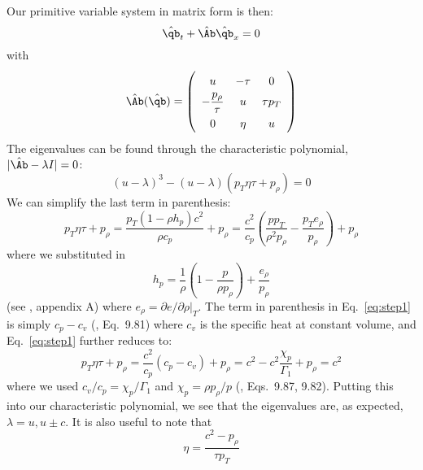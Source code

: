 Our primitive variable system in matrix form is then:
\begin{equation}
\hat{\qb}_t + \hat{\Ab} \hat{\qb}_x = 0
\end{equation}
with
\begin{equation}
\renewcommand{\arraystretch}{1.5}
\hat{\Ab}(\hat{\qb}) =
\left (
\begin{array}{ccc}
u                   & -\tau & 0 \\
-\dfrac{p_\rho}{\tau} & u    & \tau p_T \\
0                   & \eta & u
\end{array}
\right )
\end{equation}
The eigenvalues can be found through the characteristic polynomial,
$|\hat{\Ab} - \lambda I| = 0$:
\begin{equation}
(u - \lambda)^3 - (u -\lambda) \left ( {p_T \eta\tau} + p_\rho \right ) = 0
\end{equation}
We can simplify the last term in parenthesis:
\begin{equation}
{p_T \eta\tau} + p_\rho = \frac{p_T (1 - \rho h_p) c^2}{\rho c_p} + p_\rho
                               = \frac{c^2}{c_p}\left ( \frac{p p_T}{\rho^2 p_\rho} - \frac{p_T e_\rho}{p_\rho} \right ) + p_\rho \label{eq:step1}
\end{equation}
where we substituted in
\begin{equation}
h_p = \frac{1}{\rho} \left ( 1 - \frac{p}{\rho p_\rho} \right ) + \frac{e_\rho}{p_\rho}
\end{equation}
(see \cite{ABRZ:I}, appendix A) where $e_\rho = \partial e/\partial
\rho |_T$.  The term in parenthesis in Eq.~\ref{eq:step1} is simply
$c_p - c_v$ (\cite{cg}, Eq.~9.81) where $c_v$ is the specific heat
at constant volume, and Eq.~\ref{eq:step1} further reduces to:
\begin{equation}
{p_T \eta\tau} + p_\rho = \frac{c^2}{c_p} (c_p - c_v) + p_\rho
                               = c^2 - c^2 \frac{\chi_p}{\Gamma_1} + p_\rho = c^2
\end{equation}
where we used $c_v/c_p = \chi_p/\Gamma_1$ and $\chi_p = \rho p_\rho /
p$ (\cite{cg}, Eqs.~9.87, 9.82).  Putting this into our
characteristic polynomial, we see that the eigenvalues are, as expected,
$\lambda = u, u \pm c$.  It is also useful to note that
\begin{equation}
\eta = \frac{c^2 - p_\rho}{\tau p_T}
\end{equation}


